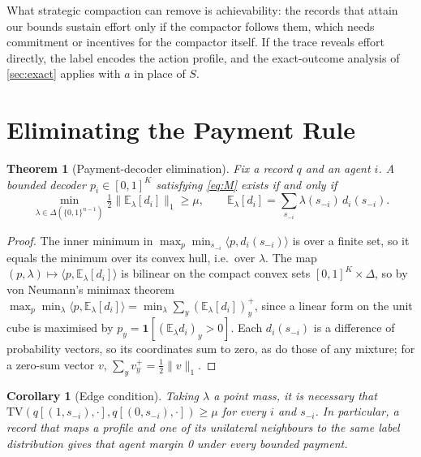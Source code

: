\documentclass[sigconf,anonymous,acmthm=false]{aamas}
\theoremstyle{acmplain}
\newtheorem{theorem}{Theorem}
\newtheorem{corollary}{Corollary}
\theoremstyle{acmdefinition}
\newcommand{\E}{\mathbb{E}}
\newcommand{\TV}{\mathrm{TV}}
\newcommand{\cube}{\{0,1\}}
\begin{document}
What strategic compaction can remove is achievability: the records that attain our bounds
sustain effort only if the compactor follows them, which needs commitment or incentives for
the compactor itself. If the trace reveals effort directly, the label encodes the action
profile, and the exact-outcome analysis of \cref{sec:exact} applies with $a$ in place of $S$.

\section{Eliminating the Payment Rule}\label{sec:elim}

\begin{theorem}[Payment-decoder elimination]\label{thm:elim}
Fix a record $q$ and an agent $i$. A bounded decoder $p_i\in[0,1]^K$ satisfying
\eqref{eq:M} exists if and only if
\[ \min_{\lambda\in\Delta(\cube^{n-1})}\tfrac12\big\|\E_\lambda[d_i]\big\|_1\ge\mu,
\qquad\E_\lambda[d_i]=\textstyle\sum_{s_{-i}}\lambda(s_{-i})\,d_i(s_{-i}). \]
\end{theorem}

\begin{proof}
The inner minimum in $\max_p\min_{s_{-i}}\langle p,d_i(s_{-i})\rangle$ is over a finite set,
so it equals the minimum over its convex hull, i.e.\ over $\lambda$. The map
$(p,\lambda)\mapsto\langle p,\E_\lambda[d_i]\rangle$ is bilinear on the compact convex sets
$[0,1]^K\times\Delta$, so by von Neumann's minimax theorem
$\max_p\min_\lambda\langle p,\E_\lambda[d_i]\rangle=\min_\lambda\sum_y(\E_\lambda[d_i])_y^+$,
since a linear form on the unit cube is maximised by $p_y=\mathbf1[(\E_\lambda d_i)_y>0]$.
Each $d_i(s_{-i})$ is a difference of probability vectors, so its coordinates sum to zero,
as do those of any mixture; for a zero-sum vector $v$, $\sum_yv_y^+=\frac12\|v\|_1$.
\end{proof}

\begin{corollary}[Edge condition]\label{cor:edge}
Taking $\lambda$ a point mass, it is necessary that
$\TV(q[(1,s_{-i}),\cdot],q[(0,s_{-i}),\cdot])\ge\mu$ for every $i$ and $s_{-i}$. In
particular, a record that maps a profile and one of its unilateral neighbours to the same
label distribution gives that agent margin 0 under every bounded payment.
\end{corollary}
\end{document}
